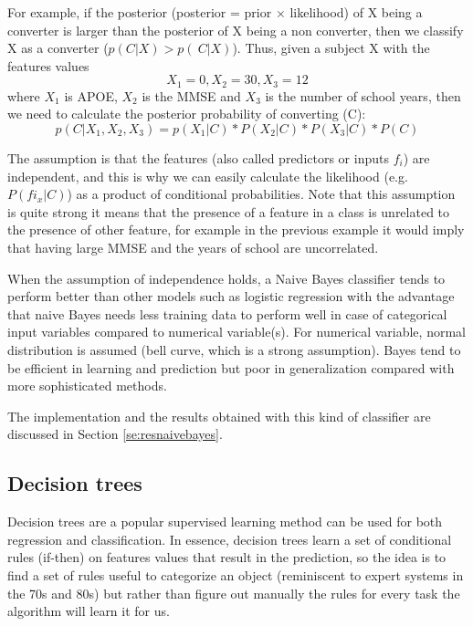 \documentclass[11pt]{article}
\begin{document}
For example, if the posterior (posterior = prior $\times$ likelihood) of X being a converter is larger than the posterior of X being a non converter, then we classify X as a converter ($p(C|X) > p(~C|X)$). Thus, given a subject X with the features values 
\begin{equation*}
X_1 = 0, X_2=30, X_3=12
\end{equation*}
where $X_1$ is APOE, $X_2$ is the MMSE and $X_3$ is the number of school years, then we need to calculate the 
posterior probability of converting (C):
\begin{equation*}
p(C|X_1,X_2,X_3) = p(X_1|C) * P(X_2|C) * P(X_3|C) * P(C)
\end{equation*}

The assumption is that the features (also called predictors or inputs $f_i$) are independent, and this is why we can easily calculate the likelihood (e.g. $P(fi_x|C)$) as a product of conditional probabilities. Note that this assumption is quite strong it means that the presence of a feature in a class is unrelated to the presence of other feature, for example in the previous example it would imply that having large MMSE and the years of school are uncorrelated.

When the assumption of independence holds, a Naive Bayes classifier tends to perform better than other models such as logistic regression with the advantage that naive Bayes needs less training data to perform well in case of categorical input variables compared to numerical variable(s). For numerical variable, normal distribution is assumed (bell curve, which is a strong assumption).
Bayes tend to be efficient in learning and prediction but poor in generalization compared with more sophisticated methods.

The implementation and the results obtained with this kind of classifier are discussed in Section \ref{se:resnaivebayes}.

\subsection{Decision trees}
\label{sse:dectrees}
Decision trees are a popular supervised learning method can be used for both regression and classification.
In essence, decision trees learn a set of conditional rules (if-then) on features values that result in the prediction, so the idea is to find a set of rules useful to categorize an object (reminiscent to expert systems in the 70s and 80s) but rather than figure out manually the rules for every task the algorithm will learn it for us.
\end{document}
